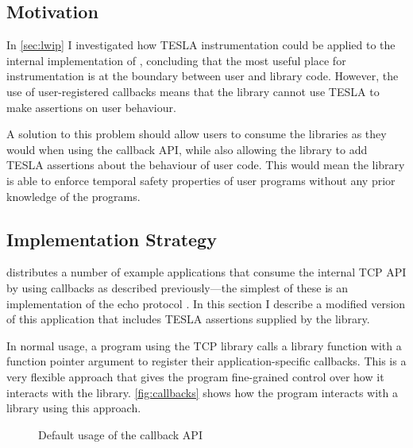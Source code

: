 \subsection{Motivation}

In \autoref{sec:lwip} I investigated how TESLA instrumentation could be applied
to the internal implementation of \lwip{}, concluding that the most useful place
for instrumentation is at the boundary between user and library code.  However,
the use of user-registered callbacks means that the library cannot use TESLA to
make assertions on user behaviour.

A solution to this problem should allow users to consume the \lwip{} libraries as
they would when using the callback API, while also allowing the library to add
TESLA assertions about the behaviour of user code. This would mean the library
is able to enforce temporal safety properties of user programs without any prior
knowledge of the programs.

\subsection{Implementation Strategy}

\lwip{} distributes a number of example applications that consume the internal TCP
API by using callbacks as described previously---the simplest of these is an
implementation of the echo protocol \cite{RFC0862}. In this section I describe a
modified version of this application that includes TESLA assertions supplied by
the library.

In normal usage, a program using the \lwip{} TCP library calls a library function
with a function pointer argument to register their application-specific
callbacks. This is a very flexible approach that gives the program fine-grained
control over how it interacts with the library. \autoref{fig:callbacks} shows
how the program interacts with a library using this approach.

\begin{figure}
  \centering
  \caption{Default usage of the \lwip{} callback API}
  \label{fig:callbacks}
\end{figure}

